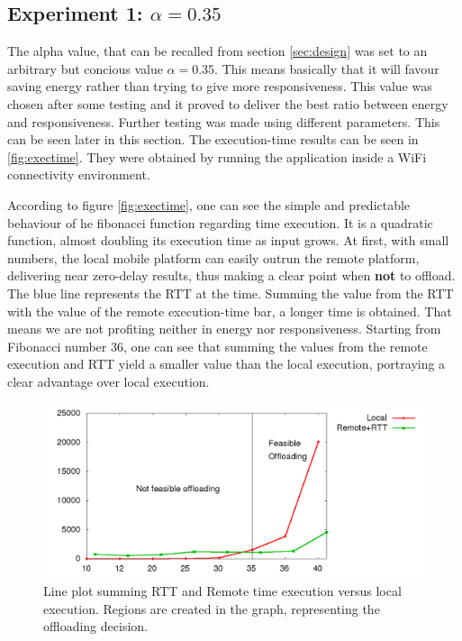 \documentclass[10pt, conference, letterpaper]{IEEEtran}
\begin{document}
  \subsection{Experiment 1: $\alpha = 0.35$}
  The alpha value, that can be recalled from section \ref{sec:design} was set to an arbitrary but concious value $\alpha = 0.35$. This means basically that it will favour saving energy rather than trying to give more responsiveness. This value was chosen after some testing and it proved to deliver the best ratio between energy and responsiveness. Further testing was made using different parameters. This can be seen later in this section. The execution-time results can be seen in \ref{fig:exectime}. They were obtained by running the application inside a WiFi connectivity environment.

  According to figure \ref{fig:exectime}, one can see the simple and predictable behaviour of he fibonacci function regarding time execution. It is a quadratic function, almost doubling its execution time as input grows. At first, with small numbers, the local mobile platform can easily outrun the remote platform, delivering near zero-delay results, thus making a clear point when \textbf{not} to offload. The blue line represents the RTT at the time. Summing the value from the RTT with the value of the remote execution-time bar, a longer time is obtained. That means we are not profiting neither in energy nor responsiveness. Starting from Fibonacci number 36, one can see that summing the values from the remote execution and RTT yield a smaller value than the local execution, portraying a clear advantage over local execution.

\begin{figure}[!t]
  \centering
  \includegraphics[width=1\textwidth]{plots/threshold/executions.png}
  \caption{Line plot summing RTT and Remote time execution versus local execution. Regions are created in the graph, representing the offloading decision.}
  \label{fig:graphregions}
\end{figure}
\end{document}
